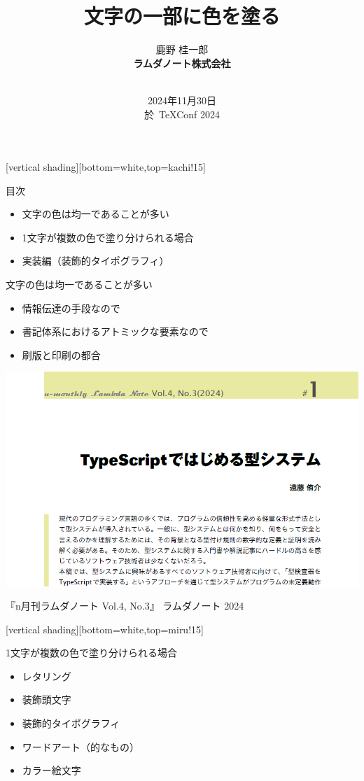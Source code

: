 \documentclass[unicode,14pt]{beamer}
\title{文字の一部に色を塗る}
\author{\sffamily 鹿野 桂一郎\\
\bfseries ラムダノート株式会社\\
\small\bfseries \email{k16.shikano@lambdanote.com} \\ 
\twitter{golden\_lucky} 
}
\date{\sffamily\footnotesize 2024年11月30日\\ 於\, TeXConf 2024}
\begin{document}
\frame{\titlepage}

[vertical shading][bottom=white,top=kachi!15]

\begin{frame}[t]{\inhibitglue 目次}
  \sffamily
  \begin{itemize}
    \item 文字の色は均一であることが多い
    \item 1文字が複数の色で塗り分けられる場合
    \item 実装編（装飾的タイポグラフィ）
  \end{itemize}
\end{frame}

\begin{frame}[t]{文字の色は均一であることが多い}
  \sffamily
  \begin{itemize}
    \item 情報伝達の手段なので
    \item 書記体系におけるアトミックな要素なので
    \item 刷版と印刷の都合
  \end{itemize}
  \begin{center}
    \includegraphics[width=.50\textwidth]{figures/nlambda.png}
  \end{center}
\raggedleft\tiny\color{50gray} 『n月刊ラムダノート Vol.4, No.3』 ラムダノート 2024
\end{frame}

[vertical shading][bottom=white,top=miru!15]

\begin{frame}[t]{1文字が複数の色で塗り分けられる場合}
  \sffamily
  \begin{itemize}
\item レタリング
\item 装飾頭文字
\item 装飾的タイポグラフィ
\item ワードアート（的なもの）
\item カラー絵文字
  \end{itemize}
\end{frame}
\end{document}
